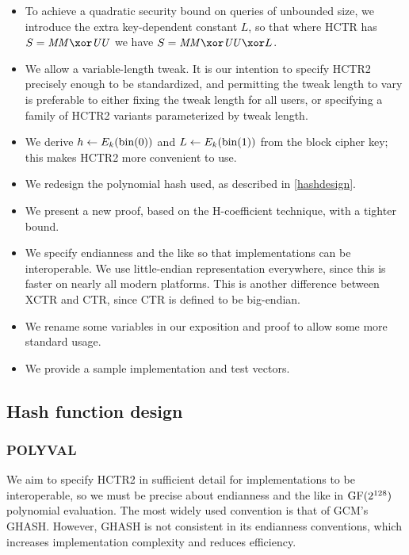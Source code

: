 \documentclass[hctr.tex]{subfiles}
\begin{document}
\begin{itemize}
    \item To achieve a quadratic security bound
    on queries of unbounded size,
    we introduce the extra
    key-dependent constant \(L\),
    so that where HCTR has \(S = \MM \xor \UU\)
    we have \(S = \MM \xor \UU \xor L\).
    \item We allow a variable-length tweak. It is our intention to specify
    HCTR2 precisely enough to be standardized, and permitting the tweak length
    to vary is preferable to either fixing the tweak length for all users,
    or specifying a family of HCTR2 variants parameterized by tweak length.
    \item We derive \(h \gets E_k(\operatorname{bin}(0))\)
    and \(L \gets E_k(\operatorname{bin}(1))\) from the block cipher key;
    this makes HCTR2 more convenient to use.
    \item We redesign the polynomial hash used, as described in
    \autoref{hashdesign}.
    \item We present a new proof, based on the H-coefficient technique,
    with a tighter bound.
    \item We specify endianness and the like so that implementations can be interoperable. We use little-endian representation everywhere,
    since this is faster on nearly all modern platforms.
    This is another difference between XCTR and CTR, since
    CTR is defined to be big-endian.
    \item We rename some variables in our exposition and proof to allow some more standard usage.
    \item We provide a sample implementation and test vectors.
\end{itemize}

\subsection{Hash function design}\label{hashdesign}

\subsubsection{POLYVAL}

We aim to specify HCTR2 in sufficient detail
for implementations to be interoperable,
so we must be precise about endianness and the like
in \(\operatorname{GF}(2^{128})\) polynomial evaluation.
The most widely used  convention is that of GCM's GHASH\cite{gcm}.
However, GHASH is not consistent in its endianness conventions,
which increases implementation complexity and reduces efficiency.
\end{document}
